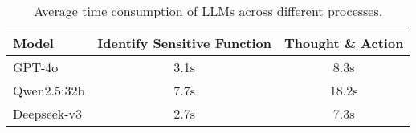 \begin{table}[htb]
\centering
\caption{Average time consumption of LLMs across different processes.}
\label{tab:time_consumption}
\begin{tabular}{lcc}
\toprule[1.5pt]
\textbf{Model} & \textbf{Identify Sensitive Function} & \textbf{Thought \& Action} \\ 
\midrule[0.8pt]
GPT-4o & 3.1s & 8.3s \\ 
Qwen2.5:32b & 7.7s & 18.2s \\ 
Deepseek-v3 & 2.7s & 7.3s \\ 
\bottomrule[1.5pt]
\end{tabular}
\end{table}
